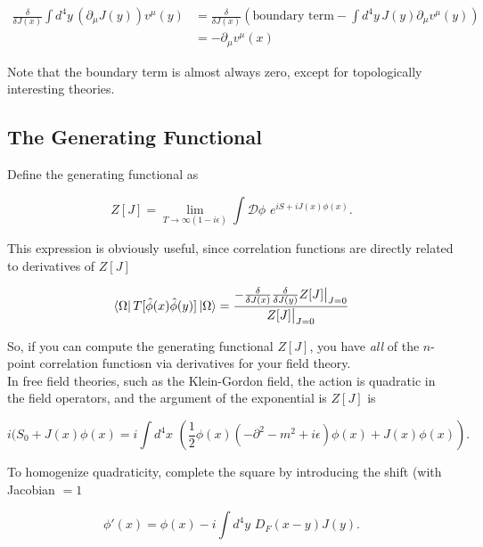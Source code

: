 \begin{align*}
\frac{\delta}{\delta J(x)} \int d^4 y \, (\partial_\mu J(y) ) v^\mu (y) &= \frac{\delta}{\delta J(x)} \left( \text{boundary term}  - \int d^4 y \, J(y) \partial_\mu v^\mu (y) \right) \\
&= -\partial_\mu v^\mu (x)
\end{align*}

\noindent Note that the boundary term is almost always zero, except for topologically interesting theories.

\subsection*{The Generating Functional}

\noindent Define the generating functional as

\begin{equation}
Z[J] = \lim_{T \rightarrow \infty(1-i \epsilon)} \int \mathcal{D} \phi \,\, e^{i S + i J(x) \phi(x)}.
\end{equation}

\noindent This expression is obviously useful, since correlation functions are directly related to derivatives of $Z[J]$

\begin{equation}
\bra{\Omega} T [ \hat{\phi} (x) \hat{\phi} (y) ] \ket{\Omega} = \frac{- \frac{\delta}{\delta J(x)}  \frac{\delta}{\delta J(y)} Z[J] \big{|}_{J=0}}{Z[J] \big{|}_{J=0}}
\end{equation}

\noindent So, if you can compute the generating functional $Z[J]$, you have \textit{all} of the $n$-point correlation functiosn via derivatives for your field theory. \\

\noindent In free field theories, such as the Klein-Gordon field, the action is quadratic in the field operators, and the argument of the exponential is $Z[J]$ is

\begin{equation}
i(S_0 + J(x) \phi (x) = i \int d^4 x \,\, \left( \frac{1}{2} \phi (x) (-\partial^2 - m^2 + i \epsilon) \phi (x) + J(x) \phi(x) \right).
\end{equation}

\noindent To homogenize quadraticity, complete the square by introducing the shift (with Jacobian $=1$

\begin{equation}
\phi' (x) = \phi (x) - i \int d^4 y \,\, D_F (x-y) J (y).
\end{equation}

